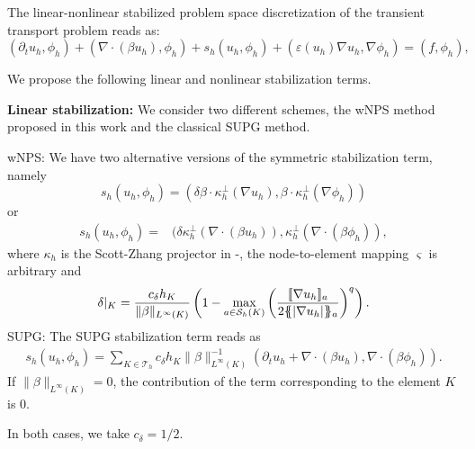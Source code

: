 \begin{algorithm}[Hhtbp]
\Indm
\small
\SetFillComment The linear-nonlinear stabilized problem space discretization of the transient transport problem reads as:
$$
(\partial_t u_h,\phi_h) +   (\nabla \cdot (\beta u_h),\phi_h) + s_h(u_h,\phi_h) + (\varepsilon(u_h) \nabla u_h, \nabla \phi_h) =  (f ,  \phi_h ),
$$

We propose the following linear and nonlinear stabilization terms.

{\bf Linear stabilization:} We consider two different schemes, the wNPS method proposed in this work and the classical SUPG method. \\
\begin{algorithmic}[1]
\State wNPS: We have two alternative versions of the symmetric stabilization term, namely
\begin{displaymath}
s_h(u_h,\phi_h) = ( \delta \beta \cdot \kappa_h^{\perp}(\nabla u_h), \beta \cdot \kappa_h^{\perp}(\nabla \phi_h))
\end{displaymath} 
  or 
\begin{align*}
s_h(u_h,\phi_h) = & ( \delta \kappa_h^{\perp}(\nabla\cdot (\beta u_h)),  \kappa_h^{\perp}(\nabla\cdot (\beta \phi_h)), 
\end{align*}
where $\kappa_h$ is the Scott-Zhang projector in -, the node-to-element mapping $\varsigma$ is arbitrary and 
\begin{align*}%
\delta|_K = \frac{c_\delta h_K}{\|\beta\|_{L^\infty(K)}}\left(1-\max_{a \in \mathcal{S}_h(K)}\left(\frac{ \jump{\nabla u_h}_a }{2\mean{|\nabla u_h|}_a}\right)^q\right).
\end{align*}
\State SUPG: The SUPG stabilization term reads as
\begin{align*}%
s_h(u_h,\phi_h) = \sum_{K \in \mathcal{T}_h} c_{\delta} {h_K}{\| \beta \|_{L^\infty(K)}^{-1}}( \partial_t u_h + \nabla \cdot (\beta u_h), \nabla \cdot (\beta  \phi_h)). \nonumber 
\end{align*}
If $\| \beta \|_{L^\infty(K)}=0$, the contribution of the term corresponding to the element $K$ is $0$. 
\end{algorithmic}

In both cases, we take $c_\delta = 1/2$.\\


\end{algorithm}
